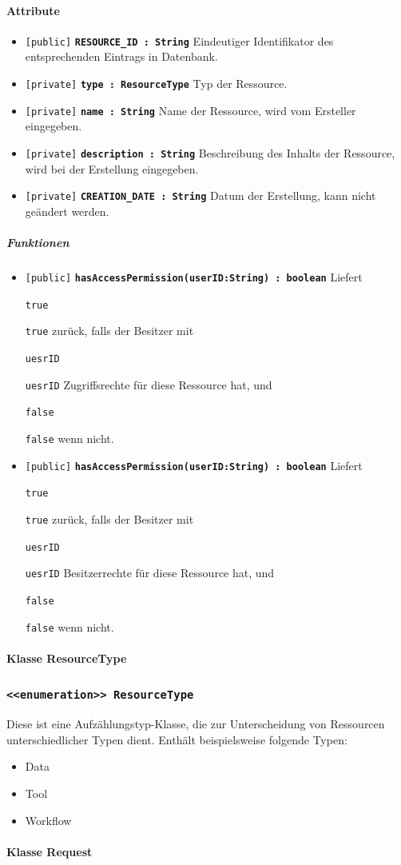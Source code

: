 \documentclass[parskip=full,11pt]{scrartcl}
\makeatletter
\newcommand{\lstInline}[2][,]{%
	\begingroup%
	\lstset{#1}%
	\begin{lrbox}{\mylisting}\lstinline!#2!\end{lrbox}%
	\setlength{\@tempdima}{\linegoal}%
	\ifdim\wd\mylisting>\@tempdima\hfill\\\fi%
	\lstinline!#2!%
	\endgroup%
}
\newcommand{\class}[1]{\subsubsection*{\lstinline[basicstyle=\ttfamily\large]{#1}}}
\newcommand{\atr}[4]{\lstinline{[#3]} \textbf{\lstinline{#1 : #2}} \newline #4}
\newcommand{\mtd}[5]{\lstinline{[#4]} \textbf{\lstinline{#1(#3) : #2}} \newline #5}
\newcommand{\inlinecode}[1]{\lstInline[breaklines=true]{#1}}
\makeatother
\begin{document}
\paragraph*{Attribute} %
\begin{itemize}
	\item \atr{RESOURCE_ID}{String}{public}{
	Eindeutiger Identifikator des entsprechenden Eintrags in Datenbank. 
	}
		\item \atr{type}{ResourceType}{private}{
	Typ der Ressource.
	}
		\item \atr{name}{String}{private}{
	Name der Ressource, wird vom Ersteller eingegeben. 
	}
		\item \atr{description}{String}{private}{
	Beschreibung des Inhalts der Ressource, wird bei der Erstellung eingegeben.
	}
		\item \atr{CREATION_DATE}{String}{private}{
	Datum der Erstellung, kann nicht geändert werden.
	}
\end{itemize}
\subparagraph*{Funktionen}  %
\begin{itemize}
	\item \mtd{hasAccessPermission}{boolean}{userID:String}{public}{
	Liefert \inlinecode{true} zurück, falls der Besitzer mit  \inlinecode{uesrID} Zugriffsrechte für diese Ressource hat, und \inlinecode{false} wenn nicht.
	}
	\item \mtd{hasAccessPermission}{boolean}{userID:String}{public}{
	Liefert \inlinecode{true} zurück, falls der Besitzer mit  \inlinecode{uesrID} Besitzerrechte für diese Ressource hat, und \inlinecode{false} wenn nicht.
	}
\end{itemize}

  \paragraph*{Klasse ResourceType}
   \class{<<enumeration>> ResourceType}
    Diese ist eine Aufzählungstyp-Klasse, die zur Unterscheidung von Ressourcen unterschiedlicher Typen dient. Enthält beispielsweise folgende Typen: 
 
\begin{itemize}
	\item{Data}
	\item{Tool}
	\item{Workflow}
	
\end{itemize}
\newpage

  \paragraph*{Klasse Request}
  
\end{document}
